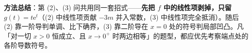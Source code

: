 \begin{answer}
\begin{gktip}
\textbf{方法总结}：第 (2)、(3) 问共用同一套招式——\textbf{先把 $f$ 中的线性项剥掉，只留 $g(t)=t\mathrm e^t$}（(2) 中线性项贡献 $-3m$ 并入常数，(3) 中线性项完全抵消）。随后 (2) 靠一阶导判单调、比下确界，(3) 靠二阶导在 $x=0$ 处的符号判局部凹凸。凡「对一切 $x>0$ 恒成立、且 $x\to0^+$ 时两边相等」的题型，都应优先考察端点处的各阶导数符号。
\end{gktip}


\gkanswer{答案（2）：$m\in\left[2\ln2,+\infty\right)$}


\end{answer}